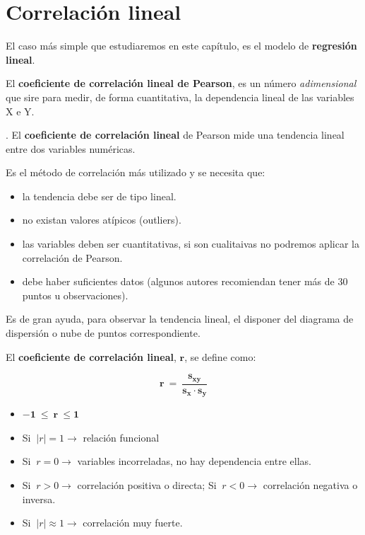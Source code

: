 \section{Correlación lineal}

El caso más simple que estudiaremos en este capítulo, es el modelo de \textbf{regresión lineal}.

 El \textbf{coeficiente de correlación lineal de Pearson}, es un número \emph{adimensional} que sire para medir, de forma cuantitativa, la dependencia lineal de las variables X e Y.

\begin{definition}
.	El \textbf{coeficiente de correlación lineal} de Pearson mide una tendencia lineal entre dos variables numéricas.

\vspace{4mm} Es el método de correlación más utilizado y se necesita que:

\begin{itemize}
\item la tendencia debe ser de tipo lineal.
\item no existan valores atípicos (outliers).
\item las variables deben ser cuantitativas, si  son cualitaivas no podremos aplicar la correlación de Pearson.
\item debe haber suficientes datos (algunos autores recomiendan tener más de 30 puntos u observaciones).
\end{itemize}
Es de gran ayuda, para observar la tendencia lineal, el disponer del diagrama de dispersión o nube de puntos correspondiente.

El \textbf{coeficiente de correlación lineal}, $\boldsymbol{r}$, se define como:

$$\boxed{\ \boldsymbol{ r\ = \ \dfrac {s_{xy}}{s_x \cdot s_y} }  \ }$$

\vspace{3mm} %
\begin{itemize}
\item $\boldsymbol{-1 \ \le \ r \ \le 1}	$
\item Si $\ |r|=1 \to $ relación funcional
\item Si $\ r=0 \to $ variables incorreladas, no hay dependencia entre ellas.
\item Si $\ r>0\to $ correlación positiva o directa; Si $\ r<0\to $ correlación negativa o inversa.
\item Si $\ |r|\approx 1 \to $ correlación muy fuerte.
\end{itemize}


\end{definition}
